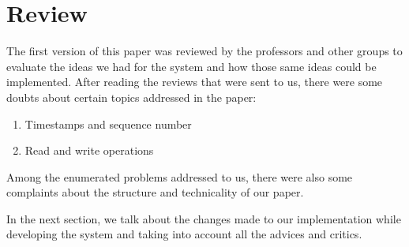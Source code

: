 \section{Review}

The first version of this paper was reviewed by the professors and other groups
to evaluate the ideas we had for the system and how those same ideas could be
implemented. After reading the reviews that were sent to us, there were some
doubts about certain topics addressed in the paper:

\begin{enumerate}

\item Timestamps and sequence number
\item Read and write operations

\end{enumerate}

Among the enumerated problems addressed to us, there were also some complaints
about the structure and technicality of our paper.

In the next section, we talk about the changes made to our implementation while
developing the system and taking into account all the advices and critics.